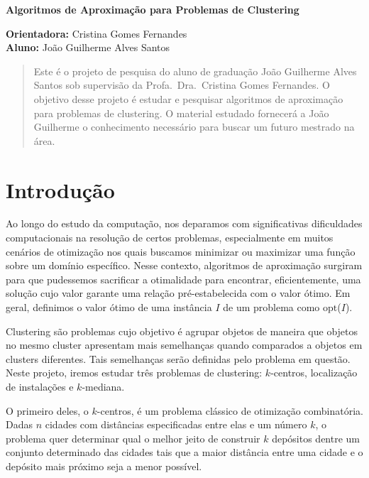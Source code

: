 \documentclass[12pt]{article}
\newcommand{\opt}{\ensuremath{\mathrm{opt}}}
\begin{document}
\begin{center}
  
{\Large {\bf Algoritmos de Aproximação para Problemas de Clustering}
}

\vspace{0.2cm}
{\small 
{\bf Orientadora:} Cristina Gomes Fernandes \\
{\bf Aluno:} João Guilherme Alves Santos
}

\vspace{5mm} 

\begin{abstract}
Este é o projeto de pesquisa do aluno de graduação João Guilherme Alves Santos sob supervisão da Profa.\ Dra.\ Cristina Gomes Fernandes. O objetivo desse projeto é estudar e pesquisar algoritmos de aproximação para problemas de clustering. O material estudado fornecerá a João Guilherme o conhecimento necessário para buscar um futuro mestrado na área.
\end{abstract}

\end{center}
\newpage

\tableofcontents

\newpage

\section{Introdução}

Ao longo do estudo da computação, nos deparamos com significativas dificuldades computacionais na resolução de certos problemas, especialmente em muitos cenários de otimização nos quais buscamos minimizar ou maximizar uma função sobre um domínio específico. Nesse contexto, algoritmos de aproximação surgiram para que pudessemos sacrificar a otimalidade para encontrar, eficientemente, uma solução cujo valor garante uma relação pré-estabelecida com o valor ótimo. Em geral, definimos o valor ótimo de uma instância $I$ de um problema como \opt($I$).

Clustering são problemas cujo objetivo é agrupar objetos de maneira que objetos no mesmo cluster apresentam mais semelhanças quando comparados a objetos em clusters diferentes. Tais semelhanças serão definidas pelo problema em questão. Neste projeto, iremos estudar três problemas de clustering: $k$-centros, localização de instalações e $k$-mediana. 



O primeiro deles, o $k$-centros, é um problema clássico de otimização combinatória. Dadas $n$ cidades com distâncias especificadas entre elas e um número $k$, o problema quer determinar qual o melhor jeito de construir $k$ depósitos dentre um conjunto determinado das cidades tais que a maior distância entre uma cidade e o depósito mais próximo seja a menor possível.
\end{document}
